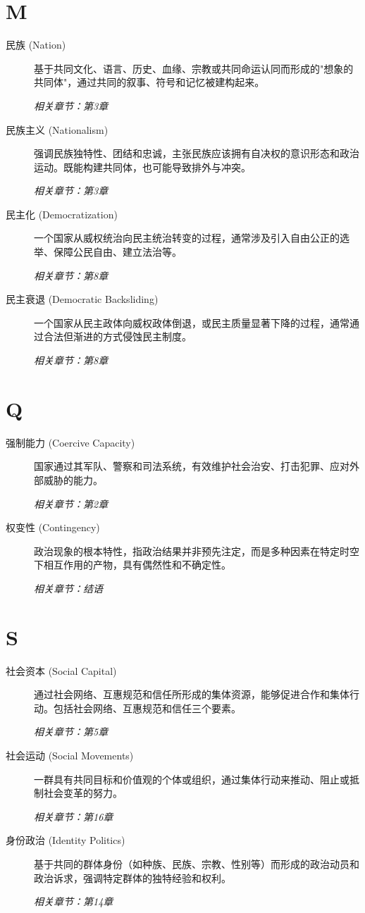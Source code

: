 \section{M}
\begin{description}
    \item[民族 (Nation)] 基于共同文化、语言、历史、血缘、宗教或共同命运认同而形成的"想象的共同体"，通过共同的叙事、符号和记忆被建构起来。 \par\textit{相关章节：第3章}
    \item[民族主义 (Nationalism)] 强调民族独特性、团结和忠诚，主张民族应该拥有自决权的意识形态和政治运动。既能构建共同体，也可能导致排外与冲突。 \par\textit{相关章节：第3章}
    \item[民主化 (Democratization)] 一个国家从威权统治向民主统治转变的过程，通常涉及引入自由公正的选举、保障公民自由、建立法治等。 \par\textit{相关章节：第8章}
    \item[民主衰退 (Democratic Backsliding)] 一个国家从民主政体向威权政体倒退，或民主质量显著下降的过程，通常通过合法但渐进的方式侵蚀民主制度。 \par\textit{相关章节：第8章}
\end{description}

\section{Q}
\begin{description}
    \item[强制能力 (Coercive Capacity)] 国家通过其军队、警察和司法系统，有效维护社会治安、打击犯罪、应对外部威胁的能力。 \par\textit{相关章节：第2章}
    \item[权变性 (Contingency)] 政治现象的根本特性，指政治结果并非预先注定，而是多种因素在特定时空下相互作用的产物，具有偶然性和不确定性。 \par\textit{相关章节：结语}
\end{description}

\section*{S}
\begin{description}
    \item[社会资本 (Social Capital)] 通过社会网络、互惠规范和信任所形成的集体资源，能够促进合作和集体行动。包括社会网络、互惠规范和信任三个要素。 \par\textit{相关章节：第5章}
    \item[社会运动 (Social Movements)] 一群具有共同目标和价值观的个体或组织，通过集体行动来推动、阻止或抵制社会变革的努力。 \par\textit{相关章节：第16章}
    \item[身份政治 (Identity Politics)] 基于共同的群体身份（如种族、民族、宗教、性别等）而形成的政治动员和政治诉求，强调特定群体的独特经验和权利。 \par\textit{相关章节：第14章}
\end{description}

